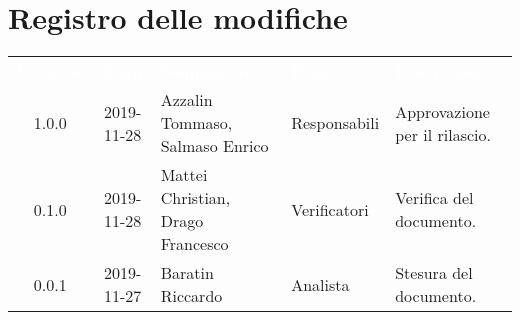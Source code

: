 \section*{Registro delle modifiche}
{
\renewcommand{\arraystretch}{1.5}
\centering
\begin{longtable}{ c c  C{4cm}  C{3cm} C{4cm}}
\textcolor{white}{\textbf{Versione}} & \textcolor{white}{\textbf{Data}} & \textcolor{white}{\textbf{Nominativo}} & \textcolor{white}{\textbf{Ruolo}} & \textcolor{white}{\textbf{Descrizione}}\\	


1.0.0 & 2019-11-28 & Azzalin Tommaso, Salmaso Enrico & Responsabili & Approvazione per il rilascio.  \\
		
0.1.0 & 2019-11-28 & Mattei Christian, Drago Francesco & Verificatori & Verifica del documento.  \\
		
0.0.1 & 2019-11-27 & Baratin Riccardo & Analista & Stesura del documento.  \\
		
		
\end{longtable}
}